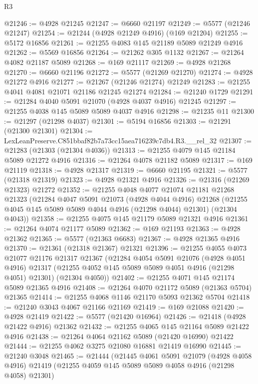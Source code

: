 \begin{lexlean}{R3}
\begin{coremodule}
@21246 := @4928 @21245
@21247 := @6660 @21197
@21249 := @5577 (@21246 @21247)
@21254 := @21244 (@4928 @21249 @4916) (@169 @21204)
@21255 := @5172 @16856
@21261 := @21255 @4083 @145 @21189 @5089 @21249 @4916
@21262 := @5569 @16856
@21264 := @21262 @305 @1132
@21267 := @21264 @4082 @21187 @5089
@21268 := @169 @21117
@21269 := @4928 @21268
@21270 := @6660 @21196
@21272 := @5577 (@21269 @21270)
@21274 := @4928 @21272 @4916
@21277 := @21267 (@21246 @21274) @21249
@21283 := @21255 @4041 @4081 @21071 @21186 @21245 @21274
@21284 := @21240 @1729
@21291 := @21284 @4040 @5091 @21070 (@4928 @4037 @4916) @21245
@21297 := @21255 @4038 @145 @5089 @5089 @4037 @4916
@21298 := @21235 @11
@21300 := @21297 (@21298 @4037)
@21301 := @5194 @16856
@21303 := @21291 (@21300 @21301)
@21304 := LexLeanPreserve.C851bbaf82b7a73cc15aea716239c7db4.R3.__rel_32
@21307 := @21283 (@21303 (@21304 @4036))
@21313 := @21255 @4079 @145 @21184 @5089 @21272 @4916
@21316 := @21264 @4078 @21182 @5089
@21317 := @169 @21119
@21318 := @4928 @21317
@21319 := @6660 @21195
@21321 := @5577 (@21318 @21319)
@21323 := @4928 @21321 @4916
@21326 := @21316 (@21269 @21323) @21272
@21352 := @21255
    @4048
    @4077
    @21074
    @21181
    @21268
    @21323
    (@21284
      @4047
      @5091
      @21073
      (@4928 @4044 @4916)
      @21268
      (@21255 @4045 @145 @5089 @5089 @4044 @4916 (@21298 @4044) @21301)
      (@21304 @4043))
@21358 := @21255 @4075 @145 @21179 @5089 @21321 @4916
@21361 := @21264 @4074 @21177 @5089
@21362 := @169 @21193
@21363 := @4928 @21362
@21365 := @5577 (@21363 @6683)
@21367 := @4928 @21365 @4916
@21370 := @21361 (@21318 @21367) @21321
@21396 := @21255
    @4055
    @4073
    @21077
    @21176
    @21317
    @21367
    (@21284
      @4054
      @5091
      @21076
      (@4928 @4051 @4916)
      @21317
      (@21255 @4052 @145 @5089 @5089 @4051 @4916 (@21298 @4051) @21301)
      (@21304 @4050))
@21402 := @21255 @4071 @145 @21174 @5089 @21365 @4916
@21408 := @21264 @4070 @21172 @5089 (@21363 @5704) @21365
@21414 := @21255 @4068 @1146 @21170 @5093 @21362 @5704
@21418 := @21240 @3043 @4067 @21166 @21169
@21419 := @169 @21088
@21420 := @4928 @21419
@21422 := @5577 (@21420 @16964)
@21426 := @21418 (@4928 @21422 @4916) @21362
@21432 := @21255 @4065 @145 @21164 @5089 @21422 @4916
@21438 := @21264 @4064 @21162 @5089 (@21420 @16990) @21422
@21444 := @21255 @4062 @3275 @21080 @16881 @21419 @16990
@21445 := @21240 @3048
@21465 := @21444
    (@21445
      @4061
      @5091
      @21079
      (@4928 @4058 @4916)
      @21419
      (@21255 @4059 @145 @5089 @5089 @4058 @4916 (@21298 @4058) @21301)

\end{coremodule}
\end{lexlean}
